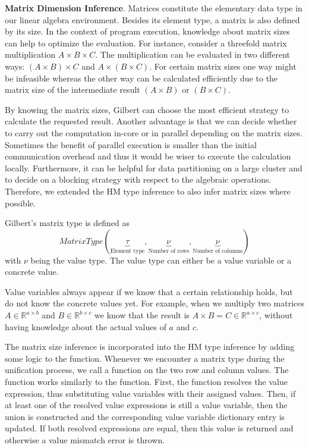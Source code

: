 
\textbf{Matrix Dimension Inference}. Matrices constitute the elementary data type in our linear algebra environment.
Besides its element type, a matrix is also defined by its size.
In the context of program execution, knowledge about matrix sizes can help to optimize the evaluation.
For instance, consider a threefold matrix multiplication $A\times B\times C$.
The multiplication can be evaluated in two different ways: $(A\times B)\times C$ and $A\times(B\times C)$.
For certain matrix sizes one way might be infeasible whereas the other way can be calculated efficiently due to the matrix size of the intermediate result $(A\times B)$ or $(B\times C)$.

By knowing the matrix sizes, Gilbert can choose the most efficient strategy to calculate the requested result.
Another advantage is that we can decide whether to carry out the computation in-core or in parallel depending on the matrix sizes.
Sometimes the benefit of parallel execution is smaller than the initial communication overhead and thus it would be wiser to execute the calculation locally.
Furthermore, it can be helpful for data partitioning on a large cluster and to decide on a blocking strategy with respect to the algebraic operations.
Therefore, we extended the HM type inference to also infer matrix sizes where possible.

Gilbert's matrix type is defined as 
\begin{displaymath}
MatrixType(\underbrace{\tau}_{\text{Element type}},\underbrace{\nu}_{\text{Number of rows}},\underbrace{\nu}_{\text{Number of columns}})
\end{displaymath}
with $\nu$ being the value type. The value type can either be a value variable or a concrete value.

Value variables always appear if we know that a certain relationship holds, but do not know the concrete values yet.
For example, when we multiply two matrices $A\in\mathbb{R}^{a\times b}$ and $B\in\mathbb{R}^{b\times c}$ we know that the result is $A\times B = C \in \mathbb{R}^{a\times c}$, without having knowledge about the actual values of $a$ and $c$.

The matrix size inference is incorporated into the HM type inference by adding some logic to the  function.
Whenever we encounter a matrix type during the unification process, we call a  function on the two row and column values.
The  function works similarly to the  function.
First, the function resolves the value expression, thus substituting value variables with their assigned values.
Then, if at least one of the resolved value expressions is still a value variable, then the union is constructed and the corresponding value variable dictionary entry is updated.
If both resolved expressions are equal, then this value is returned and otherwise a value mismatch error is thrown.

